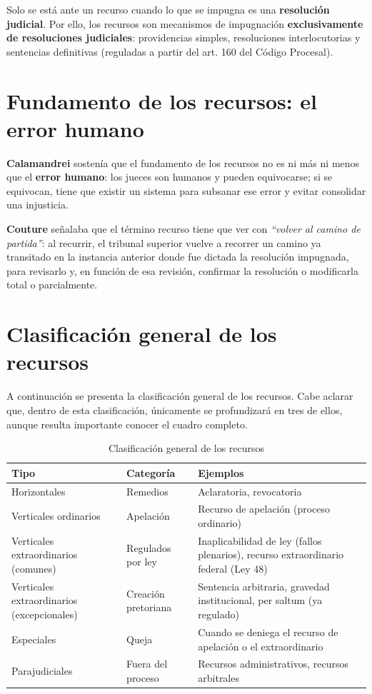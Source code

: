 \documentclass[12pt,oneside]{book}
\begin{document}
Solo se está ante un recurso cuando lo que se impugna es una \textbf{resolución judicial}. Por ello, los recursos son mecanismos de impugnación \textbf{exclusivamente de resoluciones judiciales}: providencias simples, resoluciones interlocutorias y sentencias definitivas (reguladas a partir del art. 160 del Código Procesal).

\section{Fundamento de los recursos: el error humano}

\textbf{Calamandrei} sostenía que el fundamento de los recursos no es ni más ni menos que el \textbf{error humano}: los jueces son humanos y pueden equivocarse; si se equivocan, tiene que existir un sistema para subsanar ese error y evitar consolidar una injusticia.

\textbf{Couture} señalaba que el término recurso tiene que ver con \textit{``volver al camino de partida''}: al recurrir, el tribunal superior vuelve a recorrer un camino ya transitado en la instancia anterior donde fue dictada la resolución impugnada, para revisarlo y, en función de esa revisión, confirmar la resolución o modificarla total o parcialmente.

\section{Clasificación general de los recursos}

A continuación se presenta la clasificación general de los recursos. Cabe aclarar que, dentro de esta clasificación, únicamente se profundizará en tres de ellos, aunque resulta importante conocer el cuadro completo.

\begin{table}[H]
\centering
\caption{Clasificación general de los recursos}
\begin{tabularx}{\textwidth}{l l X}
\toprule
\textbf{Tipo} & \textbf{Categoría} & \textbf{Ejemplos} \\
\midrule
Horizontales & Remedios & Aclaratoria, revocatoria \\
Verticales ordinarios & Apelación & Recurso de apelación (proceso ordinario) \\
Verticales extraordinarios (comunes) & Regulados por ley & Inaplicabilidad de ley (fallos plenarios), recurso extraordinario federal (Ley 48) \\
Verticales extraordinarios (excepcionales) & Creación pretoriana & Sentencia arbitraria, gravedad institucional, per saltum (ya regulado) \\
Especiales & Queja & Cuando se deniega el recurso de apelación o el extraordinario \\
Parajudiciales & Fuera del proceso & Recursos administrativos, recursos arbitrales \\
\bottomrule
\end{tabularx}
\end{table}
\end{document}

